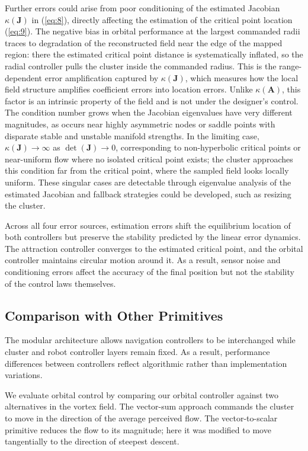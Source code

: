 \documentclass[lettersize,journal]{IEEEtran}
\begin{document}
Further errors could arise from poor conditioning of the estimated Jacobian $\kappa(\mathbf{J})$ in (\ref{eq:8}), directly affecting the estimation of the critical point location (\ref{eq:9}). The negative bias in orbital performance at the largest commanded radii traces to degradation of the reconstructed field near the edge of the mapped region: there the estimated critical point distance is systematically inflated, so the radial controller pulls the cluster inside the commanded radius. This is the range-dependent error amplification captured by $\kappa(\mathbf{J})$, which measures how the local field structure amplifies coefficient errors into location errors. Unlike $\kappa(\mathbf{A})$, this factor is an intrinsic property of the field and is not under the designer's control. The condition number grows when the Jacobian eigenvalues have very different magnitudes, as occurs near highly asymmetric nodes or saddle points with disparate stable and unstable manifold strengths. In the limiting case, $\kappa(\mathbf{J}) \to \infty$ as $\det(\mathbf{J}) \to 0$, corresponding to non-hyperbolic critical points or near-uniform flow where no isolated critical point exists; the cluster approaches this condition far from the critical point, where the sampled field looks locally uniform. These singular cases are detectable through eigenvalue analysis of the estimated Jacobian and fallback strategies could be developed, such as resizing the cluster.

Across all four error sources, estimation errors shift the equilibrium location of both controllers but preserve the stability predicted by the linear error dynamics. The attraction controller converges to the estimated critical point, and the orbital controller maintains circular motion around it. As a result, sensor noise and conditioning errors affect the accuracy of the final position but not the stability of the control laws themselves.

\subsection{Comparison with Other Primitives}

The modular architecture allows navigation controllers to be interchanged while cluster and robot controller layers remain fixed. As a result, performance differences between controllers reflect algorithmic rather than implementation variations.

We evaluate orbital control by comparing our orbital controller against two alternatives in the vortex field. The vector-sum approach commands the cluster to move in the direction of the average perceived flow. The vector-to-scalar primitive \cite{48} reduces the flow to its magnitude; here it was modified to move tangentially to the direction of steepest descent.
\end{document}
